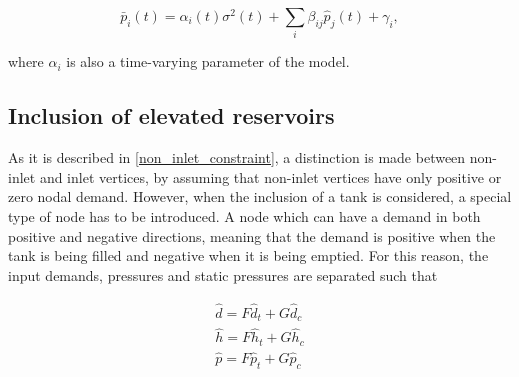 \begin{equation}
\label{model_multiinlet1}
\bar{p}_i(t) = \alpha_i(t) \sigma^2(t) + \sum_i \beta_{ij} \hat{p}_j(t) + \gamma_i,
\end{equation}

where $\alpha_i$ is also a time-varying parameter of the model. 

\subsection{Inclusion of elevated reservoirs}
\label{inclusion_of_reservoirs}

As it is described in \eqref{non_inlet_constraint}, a distinction is made between non-inlet and inlet vertices, by assuming that non-inlet vertices have only positive or zero nodal demand. However, when the inclusion of a tank is considered, a special type of node has to be introduced. A node which can have a demand in both positive and negative directions, meaning that the demand is positive when the tank is being filled and negative when it is being emptied. For this reason, the input demands, pressures and static pressures are separated such that 

\begin{equation}
\begin{split}
\label{tank_inclusion_separation_of_input}
\hat{d} = F \hat{d}_t + G \hat{d}_c \\
\hat{h} = F \hat{h}_t + G \hat{h}_c \\ 
\hat{p} = F \hat{p}_t + G \hat{p}_c
\end{split}
\end{equation}

